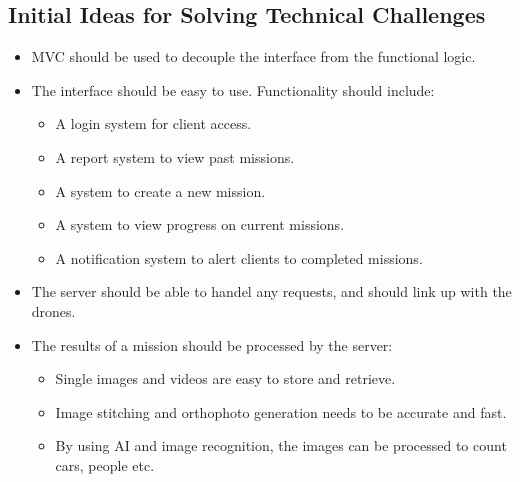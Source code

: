 \documentclass{article}
\begin{document}
	\subsection{Initial Ideas for Solving Technical Challenges}
	\begin{itemize}
		\item MVC should be used to decouple the interface from the functional logic.
		\item The interface should be easy to use. Functionality should include:
		\begin{itemize}
			\item A login system for client access.
			\item A report system to view past missions.
			\item A system to create a new mission.
			\item A system to view progress on current missions.
			\item A notification system to alert clients to completed missions.
		\end{itemize}
		\item The server should be able to handel any requests, and should link up with the drones.
		\item The results of a mission should be processed by the server:
		\begin{itemize}
			\item Single images and videos are easy to store and retrieve.
			\item Image stitching and orthophoto generation needs to be accurate and fast.
			\item By using AI and image recognition, the images can be processed to count cars, people etc.
		\end{itemize}
	\end{itemize}
\end{document}
